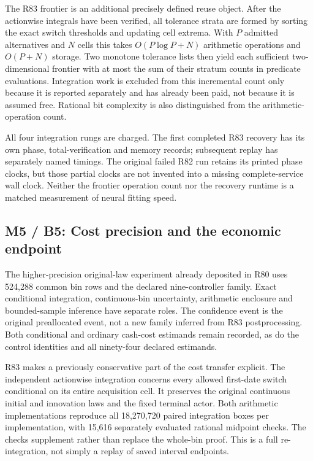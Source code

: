 \documentclass[ecta,nameyear,draft]{econsocart}
\begin{document}
The R83 frontier is an additional precisely defined reuse object. After
the actionwise integrals have been verified, all tolerance strata are
formed by sorting the exact switch thresholds and updating cell extrema.
With \(P\) admitted alternatives and \(N\) cells this takes
\(O(P\log P+N)\) arithmetic operations and \(O(P+N)\) storage. Two
monotone tolerance lists then yield each sufficient two-dimensional
frontier with at most the sum of their stratum counts in predicate
evaluations. Integration work is excluded from this incremental count
only because it is reported separately and has already been paid, not
because it is assumed free. Rational bit complexity is also
distinguished from the arithmetic-operation count.

All four integration rungs are charged. The first completed R83 recovery
has its own phase, total-verification and memory records; subsequent
replay has separately named timings. The original failed R82 run retains
its printed phase clocks, but those partial clocks are not invented into
a missing complete-service wall clock. Neither the frontier operation
count nor the recovery runtime is a matched measurement of neural
fitting speed.

\hypertarget{m5-b5-cost-precision-and-the-economic-endpoint}{%
\subsection{M5 / B5: Cost precision and the economic
endpoint}\label{m5-b5-cost-precision-and-the-economic-endpoint}}

The higher-precision original-law experiment already deposited in R80
uses 524,288 common bin rows and the declared nine-controller family.
Exact conditional integration, continuous-bin uncertainty, arithmetic
enclosure and bounded-sample inference have separate roles. The
confidence event is the original preallocated event, not a new family
inferred from R83 postprocessing. Both conditional and ordinary
cash-cost estimands remain recorded, as do the control identities and
all ninety-four declared estimands.

R83 makes a previously conservative part of the cost transfer explicit.
The independent actionwise integration concerns every allowed first-date
switch conditional on its entire acquisition cell. It preserves the
original continuous initial and innovation laws and the fixed terminal
actor. Both arithmetic implementations reproduce all 18,270,720 paired
integration boxes per implementation, with 15,616 separately evaluated
rational midpoint checks. The checks supplement rather than replace the
whole-bin proof. This is a full re-integration, not simply a replay of
saved interval endpoints.
\end{document}

